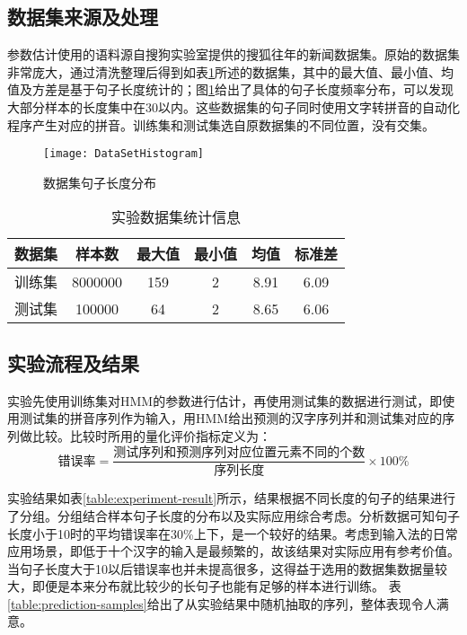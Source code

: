 \documentclass[12pt,a4paper]{ctexart}
\begin{document}
\subsection{数据集来源及处理}
参数估计使用的语料源自搜狗实验室提供的搜狐往年的新闻数据集\cite{SogouCS}。原始的数据集非常庞大，通过清洗整理后得到如表\ref{table:dataset-stat}所述的数据集，其中的最大值、最小值、均值及方差是基于句子长度统计的；图\ref{fig:datasethistogram}给出了具体的句子长度频率分布，可以发现大部分样本的长度集中在30以内。这些数据集的句子同时使用文字转拼音的自动化程序\cite{python-pinyin}产生对应的拼音。训练集和测试集选自原数据集的不同位置，没有交集。
\bigskip
\begin{figure}[H]
	\centering
	\texttt{[image: DataSetHistogram]}
	\caption{数据集句子长度分布}
	\label{fig:datasethistogram}
\end{figure}
\bigskip
\begin{table}[H]
	\centering
\begin{tabular}{cccccc}
	\toprule  %
	数据集 & 样本数 & 最大值 & 最小值& 均值& 标准差\\
	\midrule  %
		训练集 & 8000000       & 159 & 2&8.91 & 6.09\\
测试集 & 100000 & 64 & 2 & 8.65 & 6.06\\
	\bottomrule %
\end{tabular}
\caption{实验数据集统计信息}
\label{table:dataset-stat}
\end{table}
\clearpage
\subsection{实验流程及结果}
实验先使用训练集对HMM的参数进行估计，再使用测试集的数据进行测试，即使用测试集的拼音序列作为输入，用HMM给出预测的汉字序列并和测试集对应的序列做比较。比较时所用的量化评价指标定义为：
\bigskip
\[ \mbox{错误率}=\frac{\mbox{测试序列和预测序列对应位置元素不同的个数}}{\mbox{序列长度}} \times 100\% \]

\bigskip

实验结果如表\ref{table:experiment-result}所示，结果根据不同长度的句子的结果进行了分组。分组结合样本句子长度的分布以及实际应用综合考虑。分析数据可知句子长度小于10时的平均错误率在30\%上下，是一个较好的结果。考虑到输入法的日常应用场景，即低于十个汉字的输入是最频繁的，故该结果对实际应用有参考价值。当句子长度大于10以后错误率也并未提高很多，这得益于选用的数据集数据量较大，即便是本来分布就比较少的长句子也能有足够的样本进行训练。
表\ref{table:prediction-samples}给出了从实验结果中随机抽取的序列，整体表现令人满意。
\bigskip
\bigskip
\end{document}
